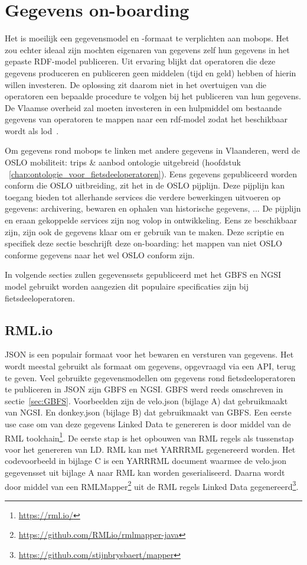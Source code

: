 \chapter{Gegevens on-boarding}
\label{chap:on-boarding}

Het is moeilijk een gegevensmodel en -formaat te verplichten aan \glspl{mobop}. Het zou echter ideaal zijn mochten eigenaren van gegevens zelf hun gegevens in het gepaste RDF-model publiceren. Uit ervaring blijkt dat operatoren die deze gegevens produceren en publiceren geen middelen (tijd en geld) hebben of hierin willen investeren. De oplossing zit daarom niet in het overtuigen van die operatoren een bepaalde procedure te volgen bij het publiceren van hun gegevens. De Vlaamse overheid zal moeten investeren in een hulpmiddel om bestaande gegevens van operatoren te mappen naar een \acrshort{rdf}-model zodat het beschikbaar wordt als \acrshort{lod}~\cite{vernaillen}.

Om gegevens rond \glspl{mobop} te linken met andere gegevens in Vlaanderen, werd de OSLO mobiliteit: trips \& aanbod ontologie uitgebreid (hoofdstuk ~\ref{chap:ontologie_voor_fietsdeeloperatoren}). Eens gegevens gepubliceerd worden conform die OSLO uitbreiding, zit het in de OSLO pijplijn. Deze pijplijn kan toegang bieden tot allerhande services die verdere bewerkingen uitvoeren op gegevens: archivering, bewaren en ophalen van historische gegevens, ... De pijplijn en eraan gekoppelde services zijn nog volop in ontwikkeling. Eens ze beschikbaar zijn, zijn ook de gegevens klaar om er gebruik van te maken. Deze scriptie en specifiek deze sectie beschrijft deze on-boarding: het mappen van niet OSLO conforme gegevens naar het wel OSLO conform zijn.

In volgende secties zullen gegevenssets gepubliceerd met het GBFS en NGSI model gebruikt worden aangezien dit populaire specificaties zijn bij fietsdeeloperatoren.

\section{RML.io}
\label{sec:rml}
JSON is een populair formaat voor het bewaren en versturen van gegevens. Het wordt meestal gebruikt als formaat om gegevens, opgevraagd via een API, terug te geven. Veel gebruikte gegevensmodellen om gegevens rond fietsdeeloperatoren te publiceren in JSON zijn GBFS en NGSI. GBFS werd reeds omschreven in sectie~\ref{sec:GBFS}. Voorbeelden zijn de velo.json (bijlage A) dat gebruikmaakt van NGSI. En donkey.json (bijlage B) dat gebruikmaakt van GBFS. 
Een eerste use case om van deze gegevens Linked Data te genereren is door middel van de RML toolchain\footnote{\url{https://rml.io/}}. De eerste stap is het opbouwen van RML regels als tussenstap voor het genereren van LD. RML kan met YARRRML gegenereerd worden. Het codevoorbeeld in bijlage C is een YARRRML document waarmee de velo.json gegevensset uit bijlage A naar RML kan worden geserialiseerd.
Daarna wordt door middel van een RMLMapper\footnote{\url{https://github.com/RMLio/rmlmapper-java}} uit de RML regels Linked Data gegenereerd\footnote{\url{https://github.com/stijnbrysbaert/mapper}}.

